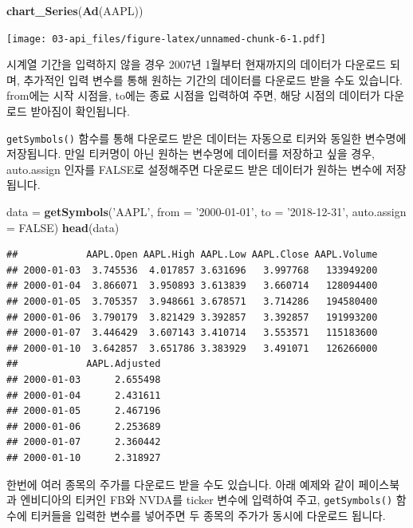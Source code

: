 \documentclass[]{book}
\newenvironment{Shaded}{\begin{snugshade}}{\end{snugshade}}
\newcommand{\DataTypeTok}[1]{\textcolor[rgb]{0.13,0.29,0.53}{#1}}
\newcommand{\KeywordTok}[1]{\textcolor[rgb]{0.13,0.29,0.53}{\textbf{#1}}}
\newcommand{\NormalTok}[1]{#1}
\newcommand{\OtherTok}[1]{\textcolor[rgb]{0.56,0.35,0.01}{#1}}
\newcommand{\StringTok}[1]{\textcolor[rgb]{0.31,0.60,0.02}{#1}}
\begin{document}
\begin{Shaded}
\begin{Highlighting}[]
\KeywordTok{chart_Series}\NormalTok{(}\KeywordTok{Ad}\NormalTok{(AAPL))}
\end{Highlighting}
\end{Shaded}

\texttt{[image: 03-api\_files/figure-latex/unnamed-chunk-6-1.pdf]}

시계열 기간을 입력하지 않을 경우 2007년 1월부터 현재까지의 데이터가 다운로드 되며, 추가적인 입력 변수를 통해 원하는 기간의 데이터를 다운로드 받을 수도 있습니다. from에는 시작 시점을, to에는 종료 시점을 입력하여 주면, 해당 시점의 데이터가 다운로드 받아짐이 확인됩니다.

\texttt{getSymbols()} 함수를 통해 다운로드 받은 데이터는 자동으로 티커와 동일한 변수명에 저장됩니다. 만일 티커명이 아닌 원하는 변수명에 데이터를 저장하고 싶을 경우, auto.assign 인자를 FALSE로 설정해주면 다운로드 받은 데이터가 원하는 변수에 저장됩니다.

\begin{Shaded}
\begin{Highlighting}[]
\NormalTok{data =}\StringTok{ }\KeywordTok{getSymbols}\NormalTok{(}\StringTok{'AAPL'}\NormalTok{, }\DataTypeTok{from =} \StringTok{'2000-01-01'}\NormalTok{, }\DataTypeTok{to =} \StringTok{'2018-12-31'}\NormalTok{, }\DataTypeTok{auto.assign =} \OtherTok{FALSE}\NormalTok{)}
\KeywordTok{head}\NormalTok{(data)}
\end{Highlighting}
\end{Shaded}

\begin{verbatim}
##            AAPL.Open AAPL.High AAPL.Low AAPL.Close AAPL.Volume
## 2000-01-03  3.745536  4.017857 3.631696   3.997768   133949200
## 2000-01-04  3.866071  3.950893 3.613839   3.660714   128094400
## 2000-01-05  3.705357  3.948661 3.678571   3.714286   194580400
## 2000-01-06  3.790179  3.821429 3.392857   3.392857   191993200
## 2000-01-07  3.446429  3.607143 3.410714   3.553571   115183600
## 2000-01-10  3.642857  3.651786 3.383929   3.491071   126266000
##            AAPL.Adjusted
## 2000-01-03      2.655498
## 2000-01-04      2.431611
## 2000-01-05      2.467196
## 2000-01-06      2.253689
## 2000-01-07      2.360442
## 2000-01-10      2.318927
\end{verbatim}

한번에 여러 종목의 주가를 다운로드 받을 수도 있습니다. 아래 예제와 같이 페이스북과 엔비디아의 티커인 FB와 NVDA를 ticker 변수에 입력하여 주고, \texttt{getSymbols()} 함수에 티커들을 입력한 변수를 넣어주면 두 종목의 주가가 동시에 다운로드 됩니다.
\end{document}
